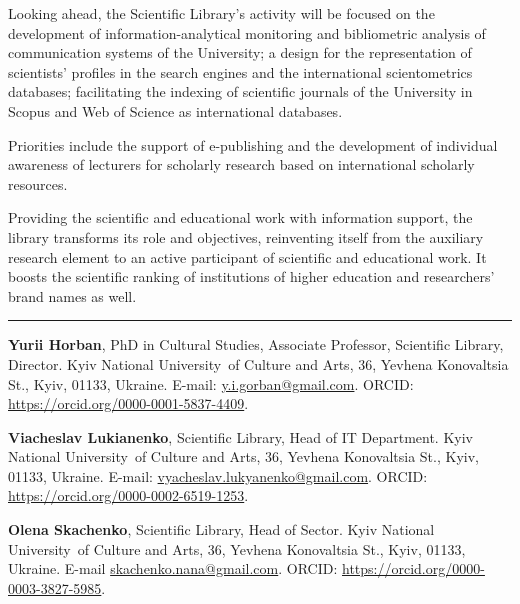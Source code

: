 \documentclass[a4paper,
fontsize=11pt,
oneside,
numbers=noperiodatend,
parskip=half-,
bibliography=totoc,
final
]{scrartcl}
\begin{document}
Looking ahead, the Scientific Library's activity will be focused on the
development of information-analytical monitoring and bibliometric
analysis of communication systems of the University; a design for the
representation of scientists' profiles in the search engines and the
international scientometrics databases; facilitating the indexing of
scientific journals of the University in Scopus and Web of Science as
international databases.

Priorities include the support of e-publishing and the development of
individual awareness of lecturers for scholarly research based on
international scholarly resources.

Providing the scientific and educational work with information support,
the library transforms its role and objectives, reinventing itself from
the auxiliary research element to an active participant of scientific
and educational work. It boosts the scientific ranking of institutions
of higher education and researchers' brand names as well.

\begin{center}\rule{0.5\linewidth}{0.5pt}\end{center}

\textbf{Yurii Horban}, PhD in Cultural Studies, Associate Professor,
Scientific Library, Director. Kyiv National University~of Culture and
Arts, 36, Yevhena Konovaltsia St., Kyiv, 01133, Ukraine. E-mail:
\href{mailto:y.i.gorban@gmail.com}{y.i.gorban@gmail.com}. ORCID: \url{https://orcid.org/0000-0001-5837-4409}.

\textbf{Viacheslav Lukianenko}, Scientific Library, Head of IT
Department. Kyiv National University~of Culture and Arts, 36, Yevhena
Konovaltsia St., Kyiv, 01133, Ukraine. E-mail:
\href{mailto:vyacheslav.lukyanenko@gmail.com}{vyacheslav.lukyanenko@gmail.com}. ORCID: \url{https://orcid.org/0000-0002-6519-1253}.

\textbf{Olena Skachenko}, Scientific Library, Head of Sector. Kyiv
National University~of Culture and Arts, 36, Yevhena Konovaltsia St.,
Kyiv, 01133, Ukraine. E-mail \href{mailto:skachenko.nana@gmail.com}{skachenko.nana@gmail.com}. ORCID:
\url{https://orcid.org/0000-0003-3827-5985}.
\end{document}
